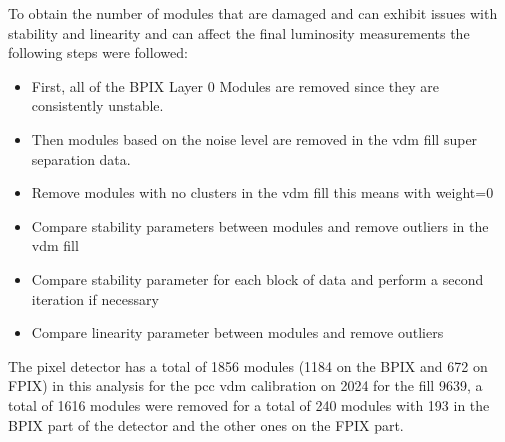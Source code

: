 To obtain the number of modules that are damaged and can exhibit issues with stability and linearity and can affect the final luminosity measurements the following steps were followed: 

\begin{itemize}
  \item First, all of the BPIX Layer 0 Modules are removed since they are consistently unstable.
  \item Then modules based on the noise level are removed in the vdm fill super separation data. 
  \item Remove modules with no clusters in the vdm fill this means with weight=0 
  \item Compare stability parameters between modules and remove outliers in the vdm fill
  \item Compare stability parameter for each block of data and perform a second iteration if necessary
  \item Compare linearity parameter between modules and remove outliers
\end{itemize}

The pixel detector has a total of 1856 modules (1184 on the BPIX and 672 on FPIX) in this analysis for the pcc vdm calibration on 2024 for the fill 9639, a total of 1616 modules were removed for a total of 240 modules with 193 in the BPIX part of the detector and the other ones on the FPIX part. 
